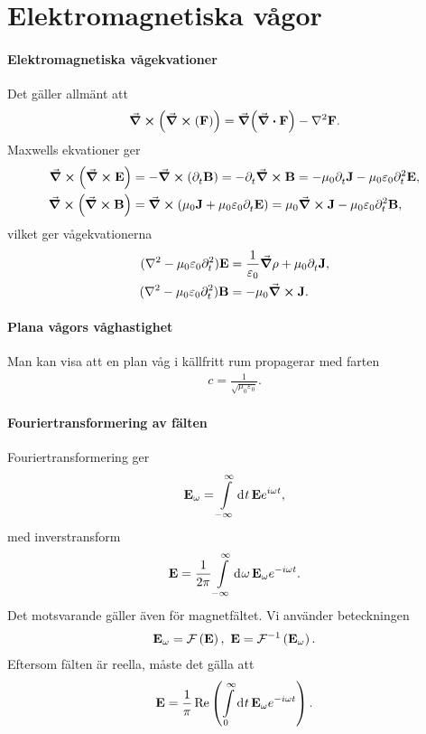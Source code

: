 \section{Elektromagnetiska vågor}

\paragraph{Elektromagnetiska vågekvationer}
Det gäller allmänt att
\begin{align*}
	\curl(\curl(\vb{F})) = \grad(\div{\vb{F}}) - \laplacian{\vb{F}}.
\end{align*}
Maxwells ekvationer ger
\begin{align*}
	\curl(\curl{\vb{E}}) &= -\curl(\del{t}{\vb{B}}) = -\del{t}{\curl{\vb{B}}} = -\mu_{0}\del{t}{\vb{J}} - \mu_{0}\varepsilon_{0}\del[2]{t}{\vb{E}}, \\
	\curl(\curl{\vb{B}}) &= \curl(\mu_{0}\vb{J} + \mu_{0}\varepsilon_{0}\del{t}{\vb{E}}) = \mu_{0}\curl{\vb{J}} - \mu_{0}\varepsilon_{0}\del[2]{t}{\vb{B}},
\end{align*}
vilket ger vågekvationerna
\begin{align*}
	(\laplacian - \mu_{0}\varepsilon_{0}\del[2]{t}{})\vb{E} &= \frac{1}{\varepsilon_{0}}\grad{\rho} + \mu_{0}\del{t}{\vb{J}}, \\
	(\laplacian - \mu_{0}\varepsilon_{0}\del[2]{t}{})\vb{B} &= -\mu_{0}\curl{\vb{J}}.
\end{align*}

\paragraph{Plana vågors våghastighet}
Man kan visa att en plan våg i källfritt rum propagerar med farten
\begin{align*}
	c = \frac{1}{\sqrt{\mu_{0}\varepsilon_{0}}}.
\end{align*}

\paragraph{Fouriertransformering av fälten}
Fouriertransformering ger
\begin{align*}
	\vb{E}_{\omega} = \integ{-\infty}{\infty}{t}{\vb{E}e^{i\omega t}},
\end{align*}
med inverstransform
\begin{align*}
	\vb{E} = \frac{1}{2\pi}\integ{-\infty}{\infty}{\omega}{\vb{E}_{\omega}e^{-i\omega t}}.
\end{align*}
Det motsvarande gäller även för magnetfältet. Vi använder beteckningen
\begin{align*}
	\vb{E}_{\omega} = \fou{\vb{E}},\ \vb{E} = \fouinv{\vb{E}_{\omega}}.
\end{align*}
Eftersom fälten är reella, måste det gälla att
\begin{align*}
	\vb{E} = \frac{1}{\pi}\Re\left(\integ{0}{\infty}{t}{\vb{E}_{\omega}e^{-i\omega t}}\right).
\end{align*}

